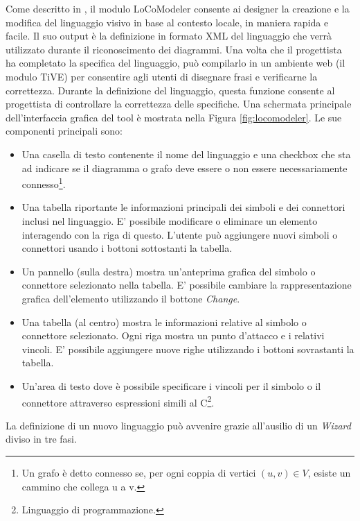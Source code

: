             Come descritto in \cite{extending_localcontext}, il modulo LoCoModeler consente ai designer la creazione e la modifica del linguaggio visivo in base al contesto locale, in maniera rapida e facile. Il suo output è la definizione in formato XML del linguaggio che verrà utilizzato durante il riconoscimento dei diagrammi. Una volta che il progettista ha completato la specifica del linguaggio, può compilarlo in un ambiente web (il modulo TiVE) per consentire agli utenti di disegnare frasi e verificarne la correttezza. Durante la definizione del linguaggio, questa funzione consente al progettista di controllare la correttezza delle specifiche.
            \newline
            Una schermata principale dell'interfaccia grafica del tool è mostrata nella Figura \ref{fig:locomodeler}. Le sue componenti principali sono:
            \begin{itemize}
                \item Una casella di testo contenente il nome del linguaggio e una checkbox che sta ad indicare se il diagramma o grafo deve essere o non essere necessariamente connesso\footnote{Un grafo è detto connesso se, per ogni coppia di vertici $(u, v)\in{V}$, esiste un cammino che collega u a v.}.
                \item Una tabella riportante le informazioni principali dei simboli e dei connettori inclusi nel linguaggio. E' possibile modificare o eliminare un elemento interagendo con la riga di questo. L'utente può aggiungere nuovi simboli o connettori usando i bottoni sottostanti la tabella.
                \item Un pannello (sulla destra) mostra un'anteprima grafica del simbolo o connettore selezionato nella tabella. E' possibile cambiare la rappresentazione grafica dell'elemento utilizzando il bottone \textit{Change}.
                \item Una tabella (al centro) mostra le informazioni relative al simbolo o connettore selezionato. Ogni riga mostra un punto d'attacco e i relativi vincoli. E' possibile aggiungere nuove righe utilizzando i bottoni sovrastanti la tabella.
                \item Un'area di testo dove è possibile specificare i vincoli per il simbolo o il connettore attraverso espressioni simili al C\footnote{Linguaggio di programmazione.}.
            \end{itemize}
            La definizione di un nuovo linguaggio può avvenire grazie all'ausilio di un \textit{Wizard} diviso in tre fasi.

